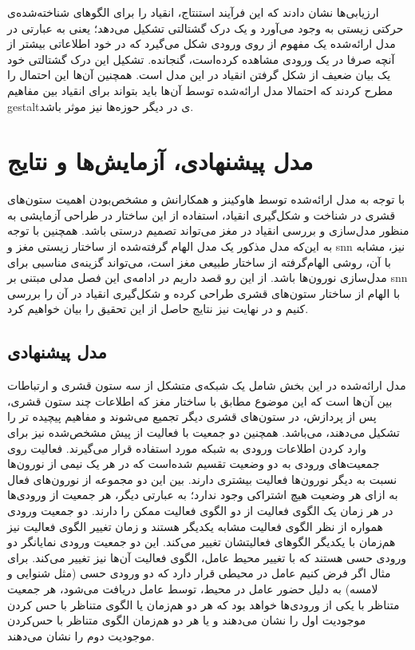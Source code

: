 \documentclass[12pt]{report}
\begin{document}
ارزیابی‌ها نشان دادند که این فرآیند استنتاج، انقیاد را برای الگو‌های شناخته‌شده‌ی حرکتی زیستی به وجود می‌آورد و یک درک گشتالتی  تشکیل می‌دهد؛ یعنی به عبارتی در مدل ارائه‌شده یک مفهوم از روی ورودی شکل می‌گیرد که در خود اطلاعاتی بیشتر از آنچه صرفا در یک ورودی مشاهده کرده‌است، گنجانده. تشکیل این درک گشتالتی خود یک بیان ضعیف از شکل گرفتن انقیاد در این مدل است.
	همچنین آن‌ها این احتمال را مطرح کردند که احتمالا مدل ارائه‌شده توسط آن‌ها باید بتواند برای انقیاد بین مفاهیم \gls{gestalt}ی در دیگر حوزه‌ها نیز موثر باشد.
	
	
	
	\chapter{مدل پیشنهادی، آزمایش‌ها و نتایج}
	
	با توجه به مدل ارائه‌شده توسط‌ هاوکینز و همکارانش و مشخص‌بودن اهمیت ستون‌های قشری در شناخت و شکل‌گیری انقیاد، استفاده از این ساختار در طراحی آزمایشی به منظور مدل‌سازی و بررسی انقیاد در مغز می‌تواند تصمیم درستی باشد. همچنین با توجه به این‌که مدل مذکور یک مدل الهام گرفته‌شده از ساختار زیستی مغز و \gls{snn} نیز، مشابه با آن، روشی الهام‌گرفته از ساختار طبیعی مغز است، می‌تواند گزینه‌ی مناسبی برای مدل‌سازی نورون‌ها باشد. از این رو قصد داریم در ادامه‌ی این فصل مدلی مبتنی بر \gls{snn} با الهام از ساختار ستون‌های قشری طراحی کرده و شکل‌گیری انقیاد در آن را بررسی کنیم و در نهایت نیز نتایج حاصل از این تحقیق را بیان خواهیم کرد.
	
	\section{مدل پیشنهادی}
	
	مدل ارائه‌شده در این بخش شامل یک شبکه‌ی متشکل از سه ستون قشری و ارتباطات بین آن‌ها است که این موضوع مطابق با ساختار مغز که اطلاعات چند ستون قشری، پس از پردازش، در ستون‌های قشری دیگر تجمیع می‌شوند و مفاهیم پیچیده تر را تشکیل می‌دهند، می‌باشد.  همچنین دو جمعیت با فعالیت از پیش مشخص‌شده نیز برای وارد کردن اطلاعات ورودی به شبکه مورد استفاده قرار می‌گیرند. فعالیت روی جمعیت‌های ورودی به دو وضعیت تقسیم شده‌است که در هر یک نیمی از نورون‌ها نسبت به دیگر نورون‌ها فعالیت بیشتری دارند. بین این دو مجموعه از نورون‌های فعال به ازای هر وضعیت هیچ اشتراکی وجود ندارد؛ به عبارتی دیگر، هر جمعیت از ورودی‌ها در هر زمان یک الگوی فعالیت از دو الگوی فعالیت ممکن را دارند. دو جمعیت ورودی همواره از نظر الگوی فعالیت مشابه یکدیگر هستند و زمان تغییر الگوی فعالیت نیز هم‌زمان با یکدیگر الگو‌های فعالیتشان تغییر می‌کند. این دو جمعیت ورودی نمایانگر دو ورودی حسی هستند که با تغییر محیط عامل، الگوی فعالیت آن‌ها نیز تغییر می‌کند. برای مثال اگر فرض کنیم عامل در محیطی قرار دارد که دو ورودی حسی (مثل شنوایی و لامسه) به دلیل حضور عامل در محیط، توسط عامل دریافت می‌شود، هر جمعیت متناظر با یکی از ورودی‌ها خواهد بود که هر دو هم‌زمان یا الگوی متناظر با حس کردن موجودیت اول را نشان‌ می‌دهند و یا هر دو هم‌زمان الگوی متناظر با حس‌کردن موجودیت دوم را نشان می‌دهند.
	
\end{document}

